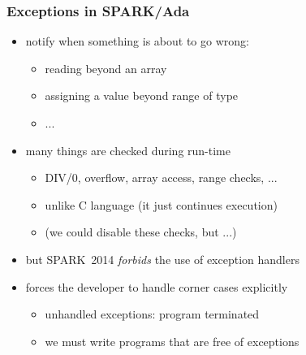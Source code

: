 
\begin{frame}[fragile]\frametitle{Exceptions in SPARK/Ada}
  \begin{itemize}
  \item notify when something is about to go wrong:
    \begin{itemize}
    \item reading beyond an array
    \item assigning a value beyond range of type
    \item ...
    \end{itemize}
  \item many things are checked during run-time
    \begin{itemize}
    \item DIV/0, overflow, array access, range checks, ...
    \item unlike C language (it just continues execution)
    \item (we could disable these checks, but ...)
    \end{itemize}
    
  \item but SPARK~2014 \emph{forbids} the use of exception handlers
  \item forces the developer to handle corner cases explicitly
     \begin{itemize}
      \item unhandled exceptions: program terminated
      \item we must write programs that are free of exceptions
    \end{itemize}
  \end{itemize}
\end{frame}
\addtocounter{clock}{2}

